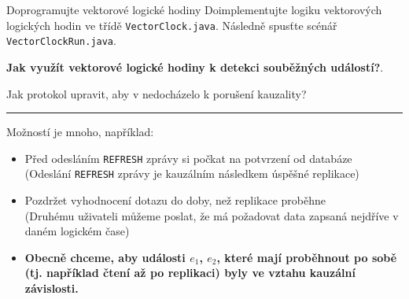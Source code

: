 \documentclass[usenames,dvipsnames,9pt]{beamer}
\begin{document}
\begin{frame}

\end{frame}


{
\begin{frame}

  \begin{block}{Doprogramujte vektorové logické hodiny}
    Doimplementujte logiku vektorových logických hodin ve třídě \texttt{VectorClock.java}. Následně spusťte scénář \texttt{VectorClockRun.java}.
  \end{block}

  \pause\faWarning \hspace{3pt}
    \textbf{Jak využít vektorové logické hodiny k detekci souběžných událostí?}.

\end{frame}
}

\begin{frame}
  \begin{center}
    \LARGE Jak protokol upravit, aby v nedocházelo k porušení kauzality?
  \end{center}

  \pause\vspace{1em}\hrule\vspace{1em}
  Možností je mnoho, například:
  \begin{itemize}
    \pause\item Před odesláním \texttt{REFRESH} zprávy si počkat na potvrzení od databáze \\
                {\small (Odeslání \texttt{REFRESH} zprávy je kauzálním následkem úspěšné replikace)}
    \pause\item Pozdržet vyhodnocení dotazu do doby, než replikace proběhne \\
                {\small (Druhému uživateli můžeme poslat, že má požadovat data zapsaná nejdříve v daném logickém čase)}
  \end{itemize}
  \pause
  \begin{itemize}
    \item[\faWarning] \bf Obecně chceme, aby události $e_1$, $e_2$, které mají proběhnout po sobě (tj. například čtení až po replikaci) byly ve vztahu kauzální závislosti.
  \end{itemize}
\end{frame}
\end{document}
